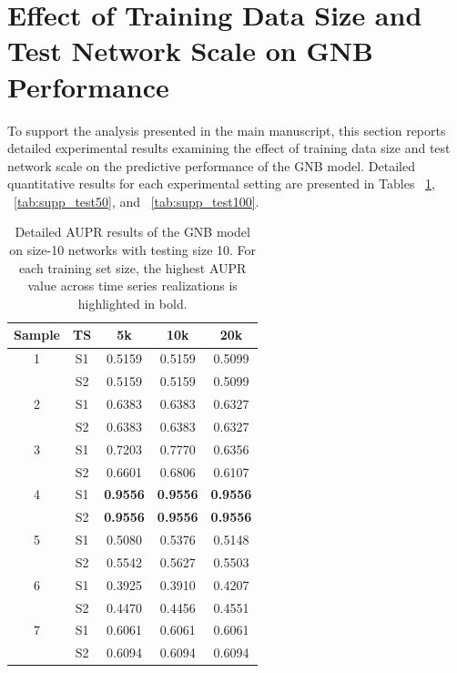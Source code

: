 \clearpage

\section{Effect of Training Data Size and Test Network Scale on GNB Performance}
To support the analysis presented in the main manuscript, this section reports detailed experimental results examining the effect of training data size and test network scale on the predictive performance of the GNB model. Detailed quantitative results for each experimental setting are presented in Tables ~\ref{tab:supp_test10}, ~\ref{tab:supp_test50}, and ~\ref{tab:supp_test100}.
\begin{table}[!h]
\centering
\caption{Detailed AUPR results of the GNB model on size-10 networks with testing size 10. For each training set size, the highest AUPR value across time series realizations is highlighted in bold.}
\label{tab:supp_test10}
{\renewcommand{\arraystretch}{0.9}
\setlength{\tabcolsep}{4pt}
\begin{tabular}{c cccc}
\toprule
Sample & TS & 5k & 10k & 20k \\
\midrule
1 & S1 & 0.5159 & 0.5159 & 0.5099 \\
  & S2 & 0.5159 & 0.5159 & 0.5099 \\

2 & S1 & 0.6383 & 0.6383 & 0.6327 \\
  & S2 & 0.6383 & 0.6383 & 0.6327 \\

3 & S1 & 0.7203 & 0.7770 & 0.6356 \\
  & S2 & 0.6601 & 0.6806 & 0.6107 \\

4 & S1 & \textbf{0.9556} & \textbf{0.9556} & \textbf{0.9556} \\
  & S2 & \textbf{0.9556} & \textbf{0.9556} & \textbf{0.9556} \\

5 & S1 & 0.5080 & 0.5376 & 0.5148 \\
  & S2 & 0.5542 & 0.5627 & 0.5503 \\

6 & S1 & 0.3925 & 0.3910 & 0.4207 \\
  & S2 & 0.4470 & 0.4456 & 0.4551 \\

7 & S1 & 0.6061 & 0.6061 & 0.6061 \\
  & S2 & 0.6094 & 0.6094 & 0.6094 \\


\end{tabular}}
\end{table}
